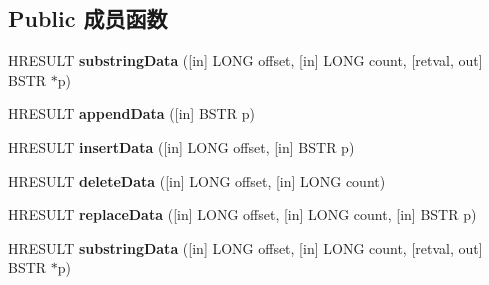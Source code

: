 \subsection*{Public 成员函数}
\begin{DoxyCompactItemize}
\item 
\mbox{\label{interface_m_s_x_m_l2_1_1_i_x_m_l_d_o_m_character_data_a74f8e5d73e36689dfc1e33f5459d0220}} 
H\+R\+E\+S\+U\+LT {\bfseries substring\+Data} (\mbox{[}in\mbox{]} L\+O\+NG offset, \mbox{[}in\mbox{]} L\+O\+NG count, \mbox{[}retval, out\mbox{]} B\+S\+TR $\ast$p)
\item 
\mbox{\label{interface_m_s_x_m_l2_1_1_i_x_m_l_d_o_m_character_data_af0c42e87b947f04f7d43529263c2a59f}} 
H\+R\+E\+S\+U\+LT {\bfseries append\+Data} (\mbox{[}in\mbox{]} B\+S\+TR p)
\item 
\mbox{\label{interface_m_s_x_m_l2_1_1_i_x_m_l_d_o_m_character_data_a5062b8f62739633567d3a8bc18777fc5}} 
H\+R\+E\+S\+U\+LT {\bfseries insert\+Data} (\mbox{[}in\mbox{]} L\+O\+NG offset, \mbox{[}in\mbox{]} B\+S\+TR p)
\item 
\mbox{\label{interface_m_s_x_m_l2_1_1_i_x_m_l_d_o_m_character_data_a4a125c94240e25ac8b3e01165ce791cc}} 
H\+R\+E\+S\+U\+LT {\bfseries delete\+Data} (\mbox{[}in\mbox{]} L\+O\+NG offset, \mbox{[}in\mbox{]} L\+O\+NG count)
\item 
\mbox{\label{interface_m_s_x_m_l2_1_1_i_x_m_l_d_o_m_character_data_a448f54e8e0951c31bdb157b3d0c267b5}} 
H\+R\+E\+S\+U\+LT {\bfseries replace\+Data} (\mbox{[}in\mbox{]} L\+O\+NG offset, \mbox{[}in\mbox{]} L\+O\+NG count, \mbox{[}in\mbox{]} B\+S\+TR p)
\item 
\mbox{\label{interface_m_s_x_m_l2_1_1_i_x_m_l_d_o_m_character_data_a74f8e5d73e36689dfc1e33f5459d0220}} 
H\+R\+E\+S\+U\+LT {\bfseries substring\+Data} (\mbox{[}in\mbox{]} L\+O\+NG offset, \mbox{[}in\mbox{]} L\+O\+NG count, \mbox{[}retval, out\mbox{]} B\+S\+TR $\ast$p)
\item 
\mbox{\label{interface_m_s_x_m_l2_1_1_i_x_m_l_d_o_m_character_data_af0c42e87b947f04f7d43529263c2a59f}} 

\end{DoxyCompactItemize}
